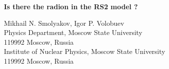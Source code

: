 \documentclass[a4paper,12pt]{article}
\begin{document}
\begin{center}
 
\vspace{1cm}

{\LARGE\bf Is there the radion in the RS2 model ?} \vspace{4mm}

{Mikhail N. Smolyakov\coordHE{}, Igor P. Volobuev\coordHE{}\\ \vspace{2mm}
\coordHE{}Physics Department, Moscow State University
\\ 119992 Moscow, Russia \\ \coordHE{}Institute of Nuclear Physics,
Moscow State University \\ 119992  Moscow, Russia }

\end{center}

\begin{abstract}{We analyse the physical boundary conditions at infinity
for metric fluctuations and  gauge functions in the RS2 model with matter
on the brane. We argue that due to these boundary conditions the radion
field cannot be gauged out in this case. Thus, it represents a physical
degree of freedom of the model.}
\end{abstract}
\end{document}
